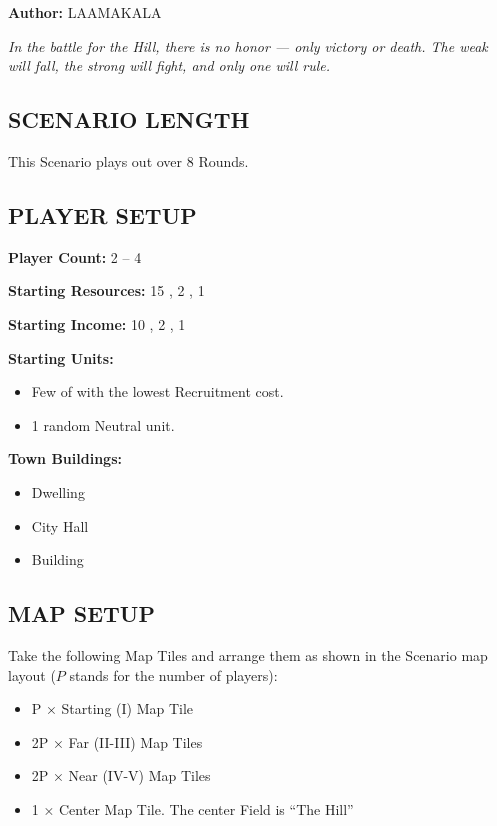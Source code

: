 
\begin{multicols*}{2}

\textbf{Author:} LAAMAKALA

\textit{In the battle for the Hill, there is no honor — only victory or death. The weak will fall, the strong will fight, and only one will rule.}

\subsection*{\MakeUppercase{Scenario Length}}
This Scenario plays out over 8 Rounds.

\subsection*{\MakeUppercase{Player Setup}}
\textbf{Player Count:} 2 -- 4

\textbf{Starting Resources:} 15 , 2 , 1 

\textbf{Starting Income:} 10 , 2 , 1 

\textbf{Starting Units:}
\begin{itemize}
  \item Few of  with the lowest Recruitment cost.
  \item 1 random Neutral  unit.
\end{itemize}

\textbf{Town Buildings:}
\begin{itemize}
  \item {} Dwelling
  \item City Hall
  \item {} Building
\end{itemize}

\subsection*{\MakeUppercase{Map Setup}}
Take the following Map Tiles and arrange them as shown in the Scenario map layout ($P$ stands for the number of players):

\begin{itemize}
  \item P × Starting (I) Map Tile
  \item 2P × Far (II-III) Map Tiles
  \item 2P × Near (IV-V) Map Tiles
  \item 1 × Center Map Tile. The center Field is ``The Hill''
\end{itemize}


\end{multicols*}
